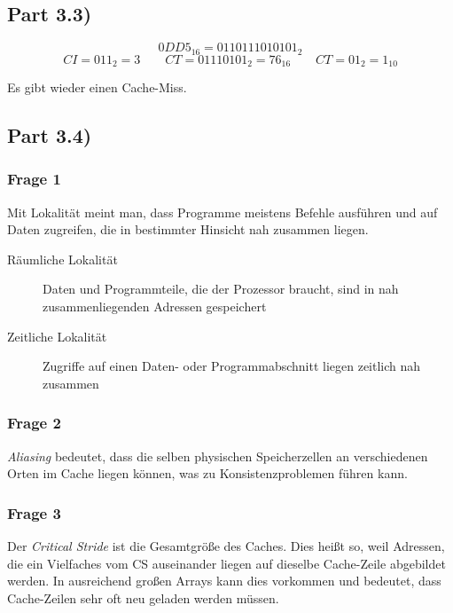 \documentclass[10pt,a4paper]{article}
\begin{document}
\subsection*{Part 3.3)}

\begin{equation*}
  0DD5_{16} = 0110111010101_{2}
\end{equation*}
\begin{equation*}
  CI = 011_{2} = 3 \qquad CT = 01110101_{2} = 76_{16} \qquad CT = 01_{2} = 1_{10}
\end{equation*}

Es gibt wieder einen Cache-Miss.

\subsection*{Part 3.4)}

\subsubsection*{Frage 1}

Mit Lokalität meint man, dass Programme meistens Befehle ausführen und auf Daten zugreifen, die in bestimmter Hinsicht nah zusammen liegen.

\begin{description}
\item[Räumliche Lokalität] Daten und Programmteile, die der Prozessor braucht, sind in nah zusammenliegenden Adressen gespeichert
\item[Zeitliche Lokalität] Zugriffe auf einen Daten- oder Programmabschnitt liegen zeitlich nah zusammen
\end{description}

\subsubsection*{Frage 2}

\emph{Aliasing} bedeutet, dass die selben physischen Speicherzellen an verschiedenen Orten im Cache liegen können, was zu Konsistenzproblemen führen kann.

\subsubsection*{Frage 3}

Der \emph{Critical Stride} ist die Gesamtgröße des Caches.
Dies heißt so, weil Adressen, die ein Vielfaches vom CS auseinander liegen auf dieselbe Cache-Zeile abgebildet werden.
In ausreichend großen Arrays kann dies vorkommen und bedeutet, dass Cache-Zeilen sehr oft neu geladen werden müssen.
\end{document}
